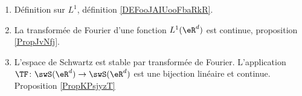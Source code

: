 
\begin{enumerate}
    \item
        Définition sur \( L^1\), définition \ref{DEFooJAIUooFbaRkR}.
    \item
        La transformée de Fourier d'une fonction \( L^1(\eR^d)\) est continue, proposition \ref{PropJvNfj}.
    \item
    L'espace de Schwartz est stable par transformée de Fourier. L'application $\TF\colon \swS(\eR^d)\to \swS(\eR^d)$ est une bijection linéaire et continue. Proposition  \ref{PropKPsjyzT}
\end{enumerate}

